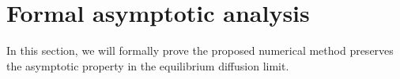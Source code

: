 \documentclass[preprint,12pt]{elsarticle}
\theoremstyle{definition}
\theoremstyle{plain}
\numberwithin{equation}{section}
\numberwithin{algorithm}{section}
\newcounter{eq_count}
\newcounter{thm_count}
\newcounter{fig_count}
\newcounter{tab_count}
\newcounter{alg_count}
\let\OldSection\section
\renewcommand{\section}{
    \setcounter{eq_count}{0}
    \setcounter{thm_count}{0}
    \setcounter{fig_count}{0}
    \setcounter{tab_count}{0}
    \setcounter{alg_count}{0}
    \OldSection
}
\begin{document}









\section{Formal asymptotic analysis}
\label{sec:analysis}

In this section, we will formally prove the proposed numerical method preserves the asymptotic property in the equilibrium diffusion limit. %
\end{document}

